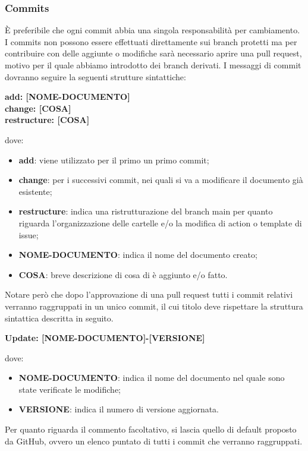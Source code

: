         \subsubsection{Commits}\label{inf:comm}
        È preferibile che ogni commit abbia una singola responsabilità per cambiamento.
        I commits non possono essere effettuati direttamente sui branch protetti ma per contribuire con delle aggiunte o
        modifiche sarà necessario aprire una pull request, motivo per il quale abbiamo introdotto dei branch derivati.
        I messaggi di commit dovranno seguire la seguenti strutture sintattiche:
        \begin{center}
            \textbf{add: [NOME-DOCUMENTO]\\
            change: [COSA]\\
            restructure: [COSA]}
        \end{center}
        dove: 
        \begin{itemize}
            \item \textbf{add}: viene utilizzato per il primo un primo commit;
            \item \textbf{change}: per i successivi commit, nei quali si va a modificare il documento già esistente;
            \item \textbf{restructure}: indica una ristrutturazione del branch main per quanto riguarda l'organizzazione delle cartelle e/o la modifica di action o template di issue;
            \item \textbf{NOME-DOCUMENTO}: indica il nome del documento creato;
            \item \textbf{COSA}: breve descrizione di cosa di è aggiunto e/o fatto.
        \end{itemize}

        Notare però che dopo l'approvazione di una pull request tutti i commit
        relativi verranno raggruppati in un unico commit, il cui titolo deve rispettare la struttura sintattica descritta in
        seguito.
        \begin{center}
            \textbf{Update: [NOME-DOCUMENTO]-[VERSIONE]}
        \end{center}
        dove:

        \begin{itemize}
            \item \textbf{NOME-DOCUMENTO}: indica il nome del documento nel quale sono state verificate le modifiche;
            \item \textbf{VERSIONE}: indica il numero di versione aggiornata.
        \end{itemize}
        Per quanto riguarda il commento facoltativo, si lascia quello di default proposto da GitHub, 
        ovvero un elenco puntato di tutti i commit che verranno raggruppati.\\
        

